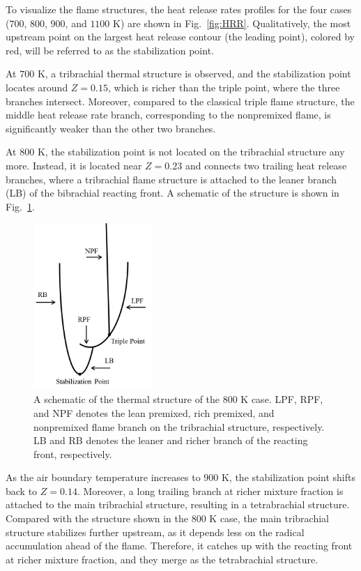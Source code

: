 \documentclass[review,3p,times]{elsarticle}
\begin{document}
To visualize the flame structures, the heat release rates profiles for the four cases ($700$, $800$, $900$, and $1100$ K) are shown in Fig.~\ref{fig:HRR}.  Qualitatively, the most upstream point on the largest heat release contour (the leading point), colored by red, will be referred to as the stabilization point.  

At $700$ K, a tribrachial thermal structure is observed, and the stabilization point locates around $Z = 0.15$, which is richer than the triple point, where the three branches intersect.  Moreover, compared to the classical triple flame structure, the middle heat release rate branch, corresponding to the nonpremixed flame, is significantly weaker than the other two branches.  

At $800$ K, the stabilization point is not located on the tribrachial structure any more.  Instead, it is located near $Z = 0.23$ and connects two trailing heat release branches, where a tribrachial flame structure is attached to the leaner branch (LB) of the bibrachial reacting front.  A schematic of the structure is shown in Fig.~\ref{fig:schematic_800}.

\begin{figure}[t]
  \centering
  \scriptsize
  \includegraphics[width=0.4\textwidth]{schematic_800.png}
  \normalsize
  \caption{A schematic of the thermal structure of the $800$ K case.  LPF, RPF, and NPF denotes the lean premixed, rich premixed, and nonpremixed flame branch on the tribrachial structure, respectively.  LB and RB denotes the leaner and richer branch of the reacting front, respectively.}
  \label{fig:schematic_800}
\end{figure}

As the air boundary temperature increases to $900$ K, the stabilization point shifts back to $Z = 0.14$.  Moreover, a long trailing branch at richer mixture fraction is attached to the main tribrachial structure, resulting in a tetrabrachial structure.  Compared with the structure shown in the $800$ K case, the main tribrachial structure stabilizes further upstream, as it depends less on the radical accumulation ahead of the flame.  Therefore, it catches up with the reacting front at richer mixture fraction, and they merge as the tetrabrachial structure.
\end{document}
